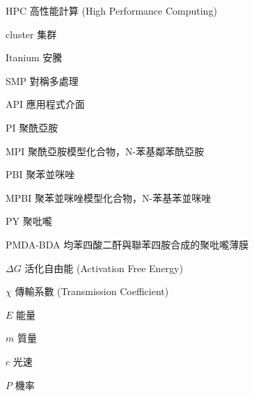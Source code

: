 
\begin{thesisDenotationEnv}[3cm]

      \item[HPC]{
                  高性能計算 (High Performance Computing)
            }

      \item[cluster]{
                  集群
            }

      \item[Itanium]{
                  安騰
            }

      \item[SMP]{
                  對稱多處理
            }

      \item[API]{
                  應用程式介面
            }

      \item[PI]{
                  聚酰亞胺
            }

      \item[MPI]{
                  聚酰亞胺模型化合物，N-苯基鄰苯酰亞胺
            }

      \item[PBI]{
                  聚苯並咪唑
            }

      \item[MPBI]{
                  聚苯並咪唑模型化合物，N-苯基苯並咪唑
            }

      \item[PY]{
                  聚吡嚨
            }

      \item[PMDA-BDA]{
                  均苯四酸二酐與聯苯四胺合成的聚吡嚨薄膜
            }

      \item[$\Delta G$]{
                  活化自由能 (Activation Free Energy)
            }

      \item[$\chi$]{
                  傳輸系數 (Transmission Coefficient)
            }

      \item[$E$]{
                  能量
            }

      \item[$m$]{
                  質量
            }

      \item[$c$]{
                  光速
            }

      \item[$P$]{
                  機率
            }

\end{thesisDenotationEnv}